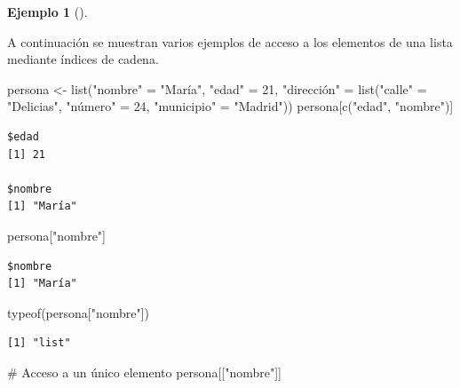 \documentclass[
  a4paper,
]{scrreport}
\newenvironment{Shaded}{\begin{snugshade}}{\end{snugshade}}
\newcommand{\CommentTok}[1]{\textcolor[rgb]{0.37,0.37,0.37}{#1}}
\newcommand{\DecValTok}[1]{\textcolor[rgb]{0.68,0.00,0.00}{#1}}
\newcommand{\FunctionTok}[1]{\textcolor[rgb]{0.28,0.35,0.67}{#1}}
\newcommand{\NormalTok}[1]{\textcolor[rgb]{0.00,0.23,0.31}{#1}}
\newcommand{\OtherTok}[1]{\textcolor[rgb]{0.00,0.23,0.31}{#1}}
\newcommand{\StringTok}[1]{\textcolor[rgb]{0.13,0.47,0.30}{#1}}
\theoremstyle{definition}
\newtheorem{example}{Ejemplo}[chapter]
\theoremstyle{definition}
\theoremstyle{remark}
\begin{document}
\leavevmode{}%
\begin{example}[]\label{exm-acceso-listas-nombres}

A continuación se muestran varios ejemplos de acceso a los elementos de
una lista mediante índices de cadena.

\begin{Shaded}
\begin{Highlighting}[]
\NormalTok{persona }\OtherTok{\textless{}{-}} \FunctionTok{list}\NormalTok{(}\StringTok{"nombre"} \OtherTok{=} \StringTok{"María"}\NormalTok{, }\StringTok{"edad"} \OtherTok{=} \DecValTok{21}\NormalTok{, }\StringTok{"dirección"} \OtherTok{=} \FunctionTok{list}\NormalTok{(}\StringTok{"calle"} \OtherTok{=} \StringTok{"Delicias"}\NormalTok{, }\StringTok{"número"} \OtherTok{=} \DecValTok{24}\NormalTok{, }\StringTok{"municipio"} \OtherTok{=} \StringTok{"Madrid"}\NormalTok{))}
\NormalTok{persona[}\FunctionTok{c}\NormalTok{(}\StringTok{"edad"}\NormalTok{, }\StringTok{"nombre"}\NormalTok{)]}
\end{Highlighting}
\end{Shaded}

\begin{verbatim}
$edad
[1] 21

$nombre
[1] "María"
\end{verbatim}

\begin{Shaded}
\begin{Highlighting}[]
\NormalTok{persona[}\StringTok{"nombre"}\NormalTok{]}
\end{Highlighting}
\end{Shaded}

\begin{verbatim}
$nombre
[1] "María"
\end{verbatim}

\begin{Shaded}
\begin{Highlighting}[]
\FunctionTok{typeof}\NormalTok{(persona[}\StringTok{"nombre"}\NormalTok{])}
\end{Highlighting}
\end{Shaded}

\begin{verbatim}
[1] "list"
\end{verbatim}

\begin{Shaded}
\begin{Highlighting}[]
\CommentTok{\# Acceso a un único elemento}
\NormalTok{persona[[}\StringTok{"nombre"}\NormalTok{]]}
\end{Highlighting}
\end{Shaded}


\end{example}
\end{document}
